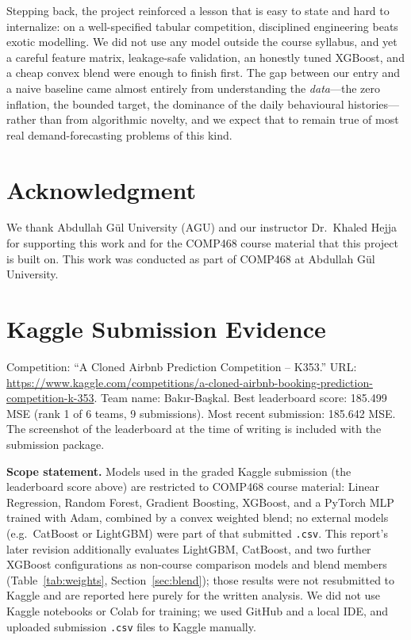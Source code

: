 \documentclass[journal]{IEEEtran}
\begin{document}
Stepping back, the project reinforced a lesson that is easy to state and hard to
internalize: on a well-specified tabular competition, disciplined engineering
beats exotic modelling. We did not use any model outside the course syllabus, and
yet a careful feature matrix, leakage-safe validation, an honestly tuned XGBoost,
and a cheap convex blend were enough to finish first. The gap between our entry
and a naive baseline came almost entirely from understanding the
\emph{data}---the zero inflation, the bounded target, the dominance of the daily
behavioural histories---rather than from algorithmic novelty, and we expect that
to remain true of most real demand-forecasting problems of this kind.

\section*{Acknowledgment}
We thank Abdullah G\"ul University (AGU) and our instructor Dr.\ Khaled Hejja for
supporting this work and for the COMP468 course material that this project is
built on. This work was conducted as part of COMP468 at Abdullah G\"ul
University.




\appendices
\section{Kaggle Submission Evidence}
Competition: ``A Cloned Airbnb Prediction Competition -- K353.''
URL: \url{https://www.kaggle.com/competitions/a-cloned-airbnb-booking-prediction-competition-k-353}.
Team name: Bak{\i}r-Ba\c{s}kal. Best leaderboard score: 185.499 MSE (rank 1 of 6
teams, 9 submissions). Most recent submission: 185.642 MSE. The screenshot of the
leaderboard at the time of writing is included with the submission package.

\vspace{4pt}
\noindent\textbf{Scope statement.} Models used in the graded Kaggle submission
(the leaderboard score above) are restricted to COMP468 course material: Linear
Regression, Random Forest, Gradient Boosting, XGBoost, and a PyTorch MLP
trained with Adam, combined by a convex weighted blend; no external models
(e.g.\ CatBoost or LightGBM) were part of that submitted \texttt{.csv}. This
report's later revision additionally evaluates LightGBM, CatBoost, and two
further XGBoost configurations as non-course comparison models and blend
members (Table~\ref{tab:weights}, Section~\ref{sec:blend}); those results were
not resubmitted to Kaggle and are reported here purely for the written
analysis. We did not use Kaggle notebooks or Colab for training; we used
GitHub and a local IDE, and uploaded submission \texttt{.csv} files to Kaggle
manually.
\end{document}
